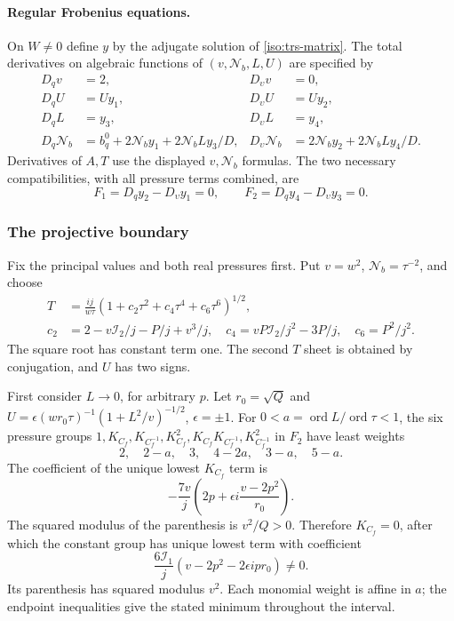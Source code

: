\documentclass[11pt,a4paper]{article}
\numberwithin{equation}{section}
\theoremstyle{plain}
\theoremstyle{definition}
\theoremstyle{remark}
\begin{document}
\paragraph{Regular Frobenius equations.}
On $W\ne0$ define $y$ by the adjugate solution of
\eqref{iso:trs-matrix}.  The total derivatives on algebraic functions of
$(v,\mathcal N_b,L,U)$ are specified by
\begin{align*}
 D_qv&=2,&D_\upsilon v&=0,\\
 D_qU&=Uy_1,&D_\upsilon U&=Uy_2,\\
 D_qL&=y_3,&D_\upsilon L&=y_4,\\
 D_q\mathcal N_b&=b_q^0+2\mathcal N_b y_1+2\mathcal N_b Ly_3/D,&
 D_\upsilon \mathcal N_b&=2\mathcal N_b y_2+2\mathcal N_b Ly_4/D.
\end{align*}
Derivatives of $A,T$ use the displayed $v,\mathcal N_b$ formulas.  The two necessary
compatibilities, with all pressure terms combined, are
\begin{equation}\label{iso:trs-frobenius}
 F_1=D_qy_2-D_\upsilon y_1=0,\qquad
 F_2=D_qy_4-D_\upsilon y_3=0.
\end{equation}

\subsubsection{The projective boundary}\label{appiso-trs-boundary}
Fix the principal values and both real pressures first.  Put $v=w^2$,
$\mathcal N_b=\tau^{-2}$, and choose
\begin{align*}
 T&=\frac{ij}{w\tau}(1+c_2\tau^2+c_4\tau^4+c_6\tau^6)^{1/2},\\
 c_2&=2-v\mathcal I_2/j-P/j+v^3/j,\quad
 c_4=vP\mathcal I_2/j^2-3P/j,\quad c_6=P^2/j^2.
\end{align*}
The square root has constant term one. The second $T$ sheet is obtained by conjugation, and $U$ has two signs.

First consider $L\to0$, for arbitrary $p$.  Let $r_0=\sqrt Q$ and
$U=\epsilon(wr_0\tau)^{-1}(1+L^2/v)^{-1/2}$, $\epsilon=\pm1$.
For $0<a=\operatorname{ord}L/\operatorname{ord}\tau<1$, the six pressure
groups $1,\allowbreak K_{C_f},\allowbreak K_{C_f^{-1}},\allowbreak K_{C_f}^2,\allowbreak K_{C_f}K_{C_f^{-1}},\allowbreak K_{C_f^{-1}}^2$ in $F_2$ have least weights
\[
 2,\quad 2-a,\quad3,\quad4-2a,\quad3-a,\quad5-a.
\]
The coefficient of the unique lowest $K_{C_f}$ term is
\[
 -\frac{7v}{j}\left(2p+\epsilon i\frac{v-2p^2}{r_0}\right).
\]
The squared modulus of the parenthesis is $v^2/Q>0$.  Therefore $K_{C_f}=0$,
after which the constant group has unique lowest term with coefficient
\[
 \frac{6\mathcal I_1}{j}(v-2p^2-2\epsilon ipr_0)\ne0.
\]
Its parenthesis has squared modulus $v^2$.  Each monomial weight is affine in $a$; the endpoint inequalities give the stated minimum throughout the interval.
\end{document}
